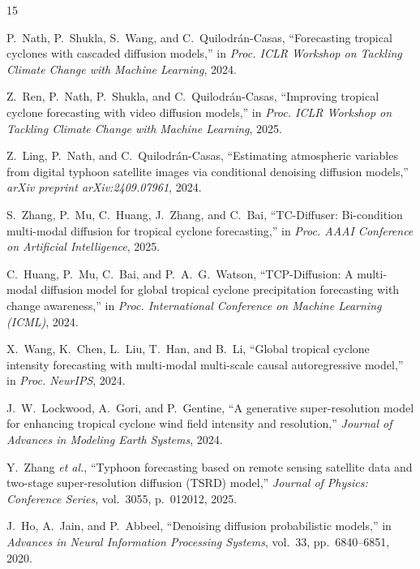 \begin{thebibliography}{15}

P.~Nath, P.~Shukla, S.~Wang, and C.~Quilodr\'{a}n-Casas, ``Forecasting tropical cyclones with cascaded diffusion models,'' in \textit{Proc. ICLR Workshop on Tackling Climate Change with Machine Learning}, 2024.

Z.~Ren, P.~Nath, P.~Shukla, and C.~Quilodr\'{a}n-Casas, ``Improving tropical cyclone forecasting with video diffusion models,'' in \textit{Proc. ICLR Workshop on Tackling Climate Change with Machine Learning}, 2025.

Z.~Ling, P.~Nath, and C.~Quilodr\'{a}n-Casas, ``Estimating atmospheric variables from digital typhoon satellite images via conditional denoising diffusion models,'' \textit{arXiv preprint arXiv:2409.07961}, 2024.

S.~Zhang, P.~Mu, C.~Huang, J.~Zhang, and C.~Bai, ``TC-Diffuser: Bi-condition multi-modal diffusion for tropical cyclone forecasting,'' in \textit{Proc. AAAI Conference on Artificial Intelligence}, 2025.

C.~Huang, P.~Mu, C.~Bai, and P.~A.~G.~Watson, ``TCP-Diffusion: A multi-modal diffusion model for global tropical cyclone precipitation forecasting with change awareness,'' in \textit{Proc. International Conference on Machine Learning (ICML)}, 2024.

X.~Wang, K.~Chen, L.~Liu, T.~Han, and B.~Li, ``Global tropical cyclone intensity forecasting with multi-modal multi-scale causal autoregressive model,'' in \textit{Proc. NeurIPS}, 2024.

J.~W.~Lockwood, A.~Gori, and P.~Gentine, ``A generative super-resolution model for enhancing tropical cyclone wind field intensity and resolution,'' \textit{Journal of Advances in Modeling Earth Systems}, 2024.

Y.~Zhang \textit{et al.}, ``Typhoon forecasting based on remote sensing satellite data and two-stage super-resolution diffusion (TSRD) model,'' \textit{Journal of Physics: Conference Series}, vol.~3055, p.~012012, 2025.

J.~Ho, A.~Jain, and P.~Abbeel, ``Denoising diffusion probabilistic models,'' in \textit{Advances in Neural Information Processing Systems}, vol.~33, pp.~6840--6851, 2020.


\end{thebibliography}
